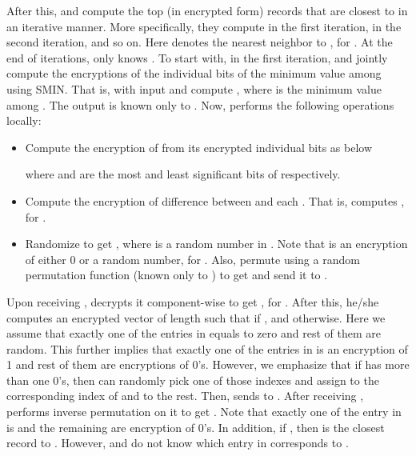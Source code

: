 \documentclass{article}
\begin{document}
After this,  and  compute the top  (in encrypted form) records that are 
closest to  in an iterative manner. More specifically, they compute 
 in the first iteration,  in the second iteration, and so on. Here  denotes 
the  nearest neighbor to , for . At the end of 
 iterations, only  knows . 
To start with, in the first iteration,  and  jointly compute the encryptions 
of the individual bits of the minimum value among  using 
SMIN. That is,  with input  
and  compute , where  is the minimum value 
among . The output  is known only to . Now,  performs 
the following operations locally:
\begin{itemize}
\item Compute the encryption of  from its encrypted individual bits as below 

where  and  are the most and least significant bits of  respectively.
\item Compute the encryption of difference between  and each . That is, 
 computes , for . 
\item Randomize  to get , where 
 is a random number in . Note that  is an encryption of 
either 0 or a random number, for . Also, permute  using a 
random permutation function  (known only to ) to get  and 
send it to .
\end{itemize} 
Upon receiving ,  decrypts it component-wise to get , 
for . After this, he/she computes an encrypted vector  of length  
such that  if , and  otherwise. Here we assume that 
exactly one of the entries in  equals to zero and rest of them are random. This further 
implies that exactly one of the entries in  is an encryption of 1 and 
rest of them are encryptions of 0's. However, we emphasize that if  has more than one 0's, 
then  can randomly pick one of those indexes and 
assign  to the corresponding index of  and  to the rest. Then,  sends  to . 
After receiving ,  performs inverse permutation on it to get 
. Note that exactly one of the entry in  is  and the remaining are 
encryption of 0's. In addition, if , then  is the closest record 
to . However,  and  do not know which entry in  corresponds 
to . 
\end{document}
